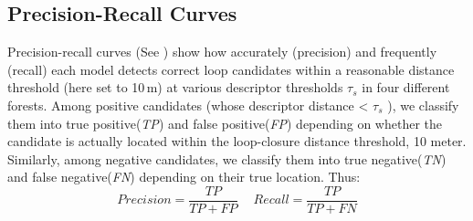 \subsection*{Precision-Recall Curves}
Precision-recall curves (See ) show how accurately (precision) and frequently (recall) each  model detects correct loop candidates within a reasonable distance threshold (here set to 10\,m) at various descriptor thresholds $\tau_{s}$ in four different forests. Among positive candidates   (whose descriptor distance < $\tau_{s}$ ), we classify them into true positive(\emph{TP}) and false positive(\emph{FP}) depending on whether the candidate is actually located within the loop-closure distance threshold, 10 meter. 
Similarly, among negative candidates, we classify them into true negative(\emph{TN}) and false negative(\emph{FN}) depending on their true location. Thus:
\[ Precision = \frac{TP}{TP + FP} \quad   \ Recall = \frac{TP}{TP + FN} \]


